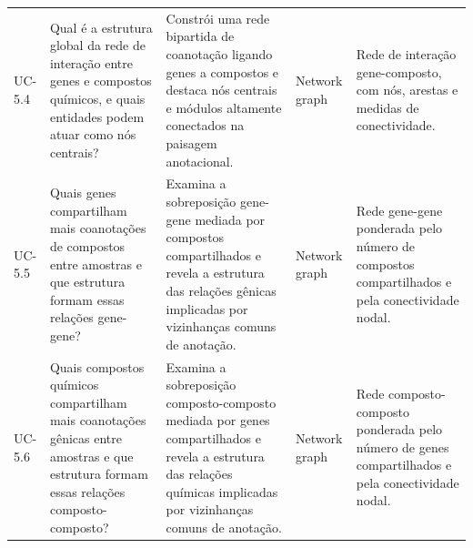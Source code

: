 \begin{landscape}
\begin{longtable}{>{\raggedright\arraybackslash}p{1.1cm} >{\raggedright\arraybackslash}p{5.0cm} >{\raggedright\arraybackslash}p{7.8cm} >{\raggedright\arraybackslash}p{4.2cm} >{\raggedright\arraybackslash}p{5.3cm}}
UC-5.4 & Qual é a estrutura global da rede de interação entre genes e compostos químicos, e quais entidades podem atuar como nós centrais? & Constrói uma rede bipartida de coanotação ligando genes a compostos e destaca nós centrais e módulos altamente conectados na paisagem anotacional. & Network graph & Rede de interação gene-composto, com nós, arestas e medidas de conectividade. \\
UC-5.5 & Quais genes compartilham mais coanotações de compostos entre amostras e que estrutura formam essas relações gene-gene? & Examina a sobreposição gene-gene mediada por compostos compartilhados e revela a estrutura das relações gênicas implicadas por vizinhanças comuns de anotação. & Network graph & Rede gene-gene ponderada pelo número de compostos compartilhados e pela conectividade nodal. \\
UC-5.6 & Quais compostos químicos compartilham mais coanotações gênicas entre amostras e que estrutura formam essas relações composto-composto? & Examina a sobreposição composto-composto mediada por genes compartilhados e revela a estrutura das relações químicas implicadas por vizinhanças comuns de anotação. & Network graph & Rede composto-composto ponderada pelo número de genes compartilhados e pela conectividade nodal. \\
\end{longtable}
\end{landscape}
\clearpage

